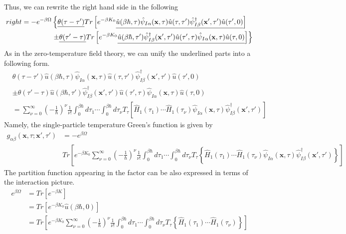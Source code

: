 Thus, we can rewrite the right hand side in the following
$$
\begin{aligned}
right=-e^{-\beta\Omega} & \left\{\uline{\theta(\tau-\tau')} Tr \left[ e^{-\beta K_0} \uline{\hat{u}(\beta\hbar,\tau) \hat{\psi}_{I\alpha}(\mathbf{x},\tau) \hat{u}(\tau,\tau') \hat{\psi}_{I\beta}^{\dagger}(\mathbf{x'},\tau') \hat{u}(\tau',0)} \right] \right.\\
&\left.\pm \uline{\theta(\tau'-\tau)} Tr\left[e^{-\beta K_0} \uline{\hat{u}(\beta\hbar,\tau') \hat{\psi}_{I\beta}^{\dagger}(\mathbf{x'},\tau') \hat{u}(\tau',\tau) \hat{\psi}_{I\alpha}(\mathbf{x},\tau) \hat{u}(\tau,0)}\right] \right\}
\end{aligned}
$$
As in the zero-temperature field theory, we can unify the underlined parts into a following form.
$$
\begin{aligned}
&\theta(\tau-\tau') \hat{u}(\beta\hbar,\tau) \hat{\psi}_{I\alpha}(\mathbf{x},\tau) \hat{u}(\tau,\tau') \hat{\psi}_{I\beta}^{\dagger}(\mathbf{x'},\tau') \hat{u}(\tau',0)\\
&\pm \theta(\tau'-\tau) \hat{u}(\beta\hbar,\tau') \hat{\psi}_{I\beta}^{\dagger}(\mathbf{x'},\tau') \hat{u}(\tau',\tau) \hat{\psi}_{I\alpha}(\mathbf{x},\tau) \hat{u}(\tau,0)\\
&=\sum_{\nu=0}^{\infty}\left(-\frac{1}{\hbar}\right)^{\nu}\frac{1}{\nu!}\int_{0}^{\beta\hbar}d\tau_1 \cdots \int_{0}^{\beta\hbar}d\tau_\nu T_\tau \left[\hat{H}_1(\tau_1) \cdots \hat{H}_1(\tau_\nu)\hat{\psi}_{I\alpha}(\mathbf{x},\tau) \hat{\psi}_{I\beta}^{\dagger}(\mathbf{x'},\tau')\right]
\end{aligned}
$$
Namely, the single-particle temperature Green's function is given by
\begin{equation}
\begin{aligned}
g_{\alpha\beta}(\mathbf{x},\tau;\mathbf{x'},\tau')&=-e^{\beta\Omega}\\
&Tr\left[e^{-\beta K_0} \sum_{\nu=0}^{\infty}\left(-\frac{1}{\hbar}\right)^{\nu}\frac{1}{\nu!}\int_{0}^{\beta\hbar}d\tau_1 \cdots \int_{0}^{\beta\hbar}d\tau_\nu T_\tau \left\{\hat{H}_1(\tau_1) \cdots \hat{H}_1(\tau_\nu)\hat{\psi}_{I\alpha}(\mathbf{x},\tau) \hat{\psi}_{I\beta}^{\dagger}(\mathbf{x'},\tau')\right\}\right]
\end{aligned}
\end{equation}
The partition function appearing in the factor can be also expressed in terms of the interaction picture.%
\begin{equation}
\begin{aligned}
e^{\beta\Omega}&=Tr\left[e^{-\beta K}\right]\\
&=Tr\left[e^{-\beta K_0}\hat{u}(\beta\hbar,0)\right]\\
&=Tr\left[e^{-\beta K_0}\sum_{\nu=0}^{\infty}\left(-\frac{1}{\hbar}\right)^{\nu}\frac{1}{\nu!}\int_{0}^{\beta\hbar}d\tau_1 \cdots \int_{0}^{\beta\hbar}d\tau_\nu T_\tau \left\{\hat{H}_1(\tau_1) \cdots \hat{H}_1(\tau_\nu)\right\}\right]
\end{aligned}
\end{equation}

